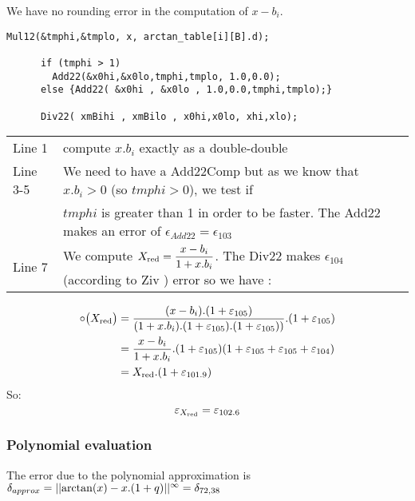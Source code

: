 We have no rounding error in the computation of $x-b_i$.

\begin{lstlisting}[caption={Reduction part 2},firstnumber=1]
      Mul12(&tmphi,&tmplo, x, arctan_table[i][B].d);

      if (tmphi > 1)
        Add22(&x0hi,&x0lo,tmphi,tmplo, 1.0,0.0);
      else {Add22( &x0hi , &x0lo , 1.0,0.0,tmphi,tmplo);}
      
      Div22( xmBihi , xmBilo , x0hi,x0lo, xhi,xlo);

\end{lstlisting}

\begin{tabular}{ll}
Line 1 & compute $x.b_i$ exactly as a double-double\\
Line 3-5 & We need to have a Add22Comp but as we know that $x.b_i > 0$ (so
$tmphi>0$), we test if\\& $tmphi$ is greater than 1 in order to be
faster. The Add22 makes an error of $\epsilon_{Add22}=\epsilon_{103}$\\
Line 7 & We compute $X_{\mathrm{red}} = \dfrac{x-b_i}{1+x.b_i}$. The Div22 makes $\epsilon_{104}$ (according to Ziv \cite{Ziv91}) error so we have :
\end{tabular}
\bigskip

\begin{equation}
\begin{split}
   \circ\big(X_{\mathrm{red}}\big) & = \frac{(x-b_i).(1+\varepsilon_{105})}{(1+x.b_i).(1+\varepsilon_{105})
          .(1+\varepsilon_{105}) )}.(1+\varepsilon_{105}) \\
         & =
          \frac{x-b_i}{1+x.b_i}.(1+\varepsilon_{105})(1+\varepsilon_{105}+\varepsilon_{105}+\varepsilon_{104})\\
         & = X_{\mathrm{red}} . (1+\varepsilon_{101.9})\nonumber
\end{split}
\end{equation}
So: 
\begin{equation}
\varepsilon_{X_{\mathrm{red}}} = \varepsilon_{102.6} \label{eps:equation}
\end{equation}



\subsubsection{Polynomial evaluation}

The error due to the polynomial approximation is $\delta_{approx} =
||{ \arctan(x) - x.(1+q)}||^{\infty}= \delta_{72,38}$ 

